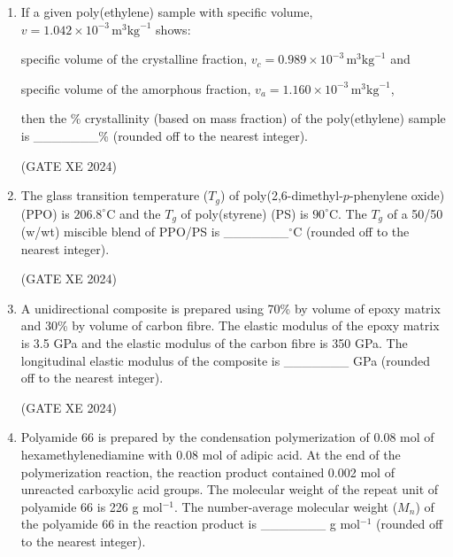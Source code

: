 \documentclass[12pt]{article}
\begin{document}
\begin{enumerate}
\begin{enumerate}
\item decreases the variation in refractive index across the film thickness  
\item decreases the amount of light scattering  
\item increases the variation in refractive index across the film thickness  
\item increases the amount of light scattering  
\end{enumerate}

(GATE XE 2024)

\item If a given poly(ethylene) sample with specific volume, $v = 1.042 \times 10^{-3} \,\text{m}^3 \text{kg}^{-1}$ shows:  

specific volume of the crystalline fraction, $v_c = 0.989 \times 10^{-3} \,\text{m}^3 \text{kg}^{-1}$ and  

specific volume of the amorphous fraction, $v_a = 1.160 \times 10^{-3} \,\text{m}^3 \text{kg}^{-1}$,  

then the \% crystallinity (based on mass fraction) of the poly(ethylene) sample is \_\_\_\_\_\_\_\% (rounded off to the nearest integer).  

(GATE XE 2024)

\item The glass transition temperature ($T_g$) of poly(2,6-dimethyl-$p$-phenylene oxide) (PPO) is $206.8^\circ$C and the $T_g$ of poly(styrene) (PS) is $90^\circ$C. The $T_g$ of a 50/50 (w/wt) miscible blend of PPO/PS is \_\_\_\_\_\_\_$^\circ$C (rounded off to the nearest integer).  

(GATE XE 2024)

\item A unidirectional composite is prepared using 70\% by volume of epoxy matrix and 30\% by volume of carbon fibre. The elastic modulus of the epoxy matrix is 3.5 GPa and the elastic modulus of the carbon fibre is 350 GPa. The longitudinal elastic modulus of the composite is \_\_\_\_\_\_\_ GPa (rounded off to the nearest integer).  

(GATE XE 2024)

\item Polyamide 66 is prepared by the condensation polymerization of 0.08 mol of hexamethylenediamine with 0.08 mol of adipic acid. At the end of the polymerization reaction, the reaction product contained 0.002 mol of unreacted carboxylic acid groups. The molecular weight of the repeat unit of polyamide 66 is 226 g mol$^{-1}$. The number-average molecular weight ($M_n$) of the polyamide 66 in the reaction product is \_\_\_\_\_\_\_ g mol$^{-1}$ (rounded off to the nearest integer).  


\end{enumerate}
\end{document}
